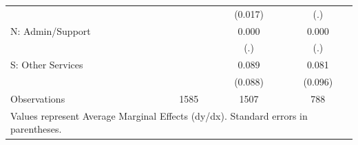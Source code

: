 \begin{table}[htbp]
\begin{tabular}{l*{3}{c}}
                    &                     &     (0.017)         &         (.)         \\
\addlinespace
N: Admin/Support    &                     &       0.000         &       0.000         \\
                    &                     &         (.)         &         (.)         \\
\addlinespace
S: Other Services   &                     &       0.089         &       0.081         \\
                    &                     &     (0.088)         &     (0.096)         \\
\midrule
Observations        &        1585         &        1507         &         788         \\
\bottomrule
\multicolumn{4}{l}{\footnotesize Values represent Average Marginal Effects (dy/dx). Standard errors in parentheses.}\\
\end{tabular}
\end{table}
